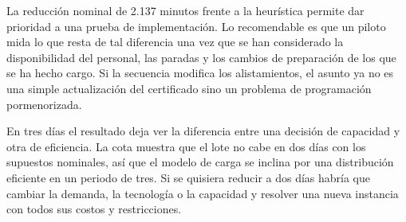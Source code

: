 La reducción nominal de 2.137 minutos frente a la heurística permite dar prioridad a una prueba de implementación. Lo recomendable es que un piloto mida lo que resta de tal diferencia una vez que se han considerado la disponibilidad del personal, las paradas y los cambios de preparación de los que se ha hecho cargo. Si la secuencia modifica los alistamientos, el asunto ya no es una simple actualización del certificado sino un problema de programación pormenorizada.

En tres días el resultado deja ver la diferencia entre una decisión de capacidad y otra de eficiencia. La cota muestra que el lote no cabe en dos días con los supuestos nominales, así que el modelo de carga se inclina por una distribución eficiente en un periodo de tres. Si se quisiera reducir a dos días habría que cambiar la demanda, la tecnología o la capacidad y resolver una nueva instancia con todos sus costos y restricciones.
